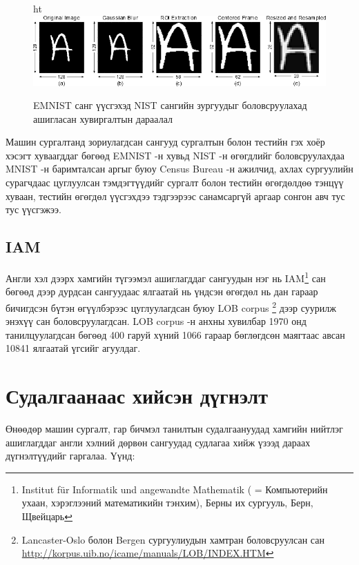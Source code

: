 \begin{figure}{ht}
	\centering
	\includegraphics[width=1\linewidth]{images/emnist}
	\caption{EMNIST санг үүсгэхэд NIST сангийн зургуудыг боловсруулахад ашигласан хувиргалтын дараалал \cite{emnist}}
	\label{fig:emnist-conversion}
\end{figure}

Машин сургалтанд зориулагдсан сангууд сургалтын болон тестийн гэх хоёр хэсэгт хуваагддаг бөгөөд EMNIST -н хувьд NIST -н өгөгдлийг боловсруулахдаа MNIST -н баримталсан аргыг буюу Census Bureau -н ажилчид, ахлах сургуулийн сурагчдаас цуглуулсан тэмдэгтүүдийг сургалт болон тестийн өгөгдөлдөө тэнцүү хуваан, тестийн өгөгдөл үүсгэхдээ тэдгээрээс санамсаргүй аргаар сонгон авч тус тус үүсгэжээ.

\subsection{IAM \cite{iam-database}}

Англи хэл дээрх хамгийн түгээмэл ашиглагддаг сангуудын нэг нь IAM\footnote{Institut für Informatik und angewandte Mathematik ( = Компьютерийн ухаан, хэрэглээний математикийн тэнхим), Берны их сургууль, Берн, Щвейцарь} сан бөгөөд дээр дурдсан сангуудаас ялгаатай нь үндсэн өгөгдөл нь дан гараар бичигдсэн бүтэн өгүүлбэрээс цуглуулагдсан буюу LOB corpus \cite{lob-corpus}\footnote{Lancaster-Oslo болон Bergen сургуулиудын хамтран боловсруулсан сан \url{http://korpus.uib.no/icame/manuals/LOB/INDEX.HTM}} дээр суурилж энэхүү сан боловсруулагдсан. LOB corpus -н анхны хувилбар 1970 онд танилцуулагдсан бөгөөд 400 гаруй хүний 1066 гараар бөглөгдсөн маягтаас авсан 10841 ялгаатай үгсийг агуулдаг.

\section{Судалгаанаас хийсэн дүгнэлт}

Өнөөдөр машин сургалт, гар бичмэл танилтын судалгаануудад хамгийн нийтлэг ашиглагддаг англи хэлний дөрвөн сангуудад судлагаа хийж үзээд дараах дүгнэлтүүдийг гаргалаа. Үүнд:

